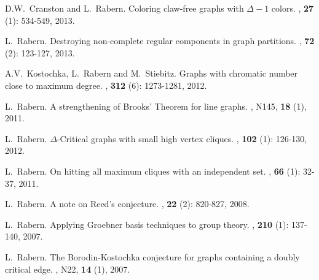 \documentclass[margin,line]{res}
\begin{document}
\begin{resume}
\begin{enumerate}[{[}1{]}]
\item
D.W.~Cranston and L.~Rabern.
\newblock Coloring claw-free graphs with $\Delta - 1$ colors.
, \textbf{27} (1): 534-549, 2013.

\smallskip

\item
L.~Rabern.
\newblock Destroying non-complete regular components in graph partitions.
, \textbf{72} (2): 123-127, 2013.

\smallskip

\item A.V.~Kostochka, L.~Rabern and M.~Stiebitz.
\newblock Graphs with chromatic number close to maximum degree.
,  \textbf{312} (6): 1273-1281, 2012.

\smallskip

\item L.~Rabern.
\newblock A strengthening of Brooks' Theorem for line graphs.
, N145, \textbf{18} (1), 2011.

\smallskip

\item L.~Rabern.
\newblock $\Delta$-Critical graphs with small high vertex cliques.
, \textbf{102} (1): 126-130, 2012.

\smallskip

\item L.~Rabern. 
\newblock On hitting all maximum cliques with an independent set.
, \textbf{66} (1): 32-37, 2011.

\smallskip

\item L.~Rabern.
\newblock A note on Reed's conjecture.
, \textbf{22} (2): 820-827, 
	2008.

\smallskip

\item L.~Rabern.
\newblock Applying Groebner basis techniques to group theory.
, \textbf{210} (1): 137-140, 2007.

\smallskip

\item
L.~Rabern.
\newblock The Borodin-Kostochka conjecture for graphs containing a doubly critical edge.
, N22, \textbf{14} (1), 2007.


\end{enumerate}
\end{resume}
\end{document}
